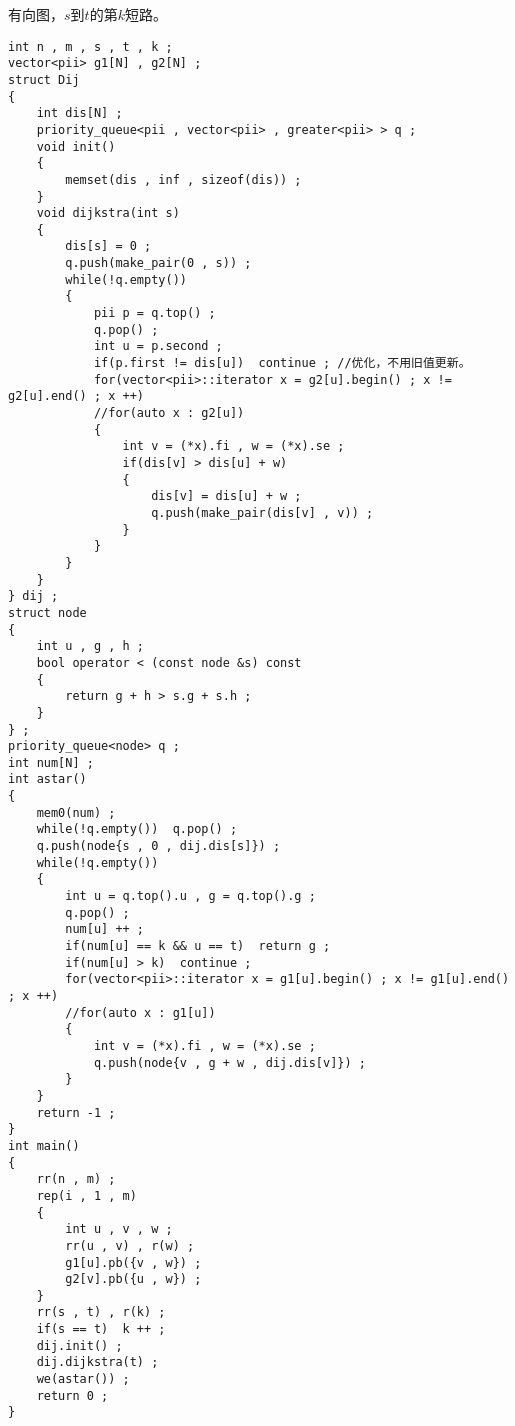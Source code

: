 \documentclass[E:/GsjzTle/main/main.tex]{subfiles}
\begin{document}
有向图，$s$到$t$的第$k$短路。

\begin{lstlisting}
int n , m , s , t , k ;
vector<pii> g1[N] , g2[N] ; 
struct Dij
{
	int dis[N] ;
	priority_queue<pii , vector<pii> , greater<pii> > q ;
	void init()
	{
		memset(dis , inf , sizeof(dis)) ;	
	}
	void dijkstra(int s)
	{
		dis[s] = 0 ;
		q.push(make_pair(0 , s)) ;
		while(!q.empty())
		{
			pii p = q.top() ;
			q.pop() ;
			int u = p.second ;
			if(p.first != dis[u])  continue ; //优化，不用旧值更新。
			for(vector<pii>::iterator x = g2[u].begin() ; x != g2[u].end() ; x ++)
			//for(auto x : g2[u])
			{
				int v = (*x).fi , w = (*x).se ;
				if(dis[v] > dis[u] + w)
				{
					dis[v] = dis[u] + w ;
					q.push(make_pair(dis[v] , v)) ;
				}
			}
		}
	}
} dij ;
struct node
{
	int u , g , h ;
	bool operator < (const node &s) const
	{
		return g + h > s.g + s.h ;
	}
} ;
priority_queue<node> q ;
int num[N] ;
int astar()
{
	mem0(num) ;
	while(!q.empty())  q.pop() ;
	q.push(node{s , 0 , dij.dis[s]}) ;
	while(!q.empty())
	{
		int u = q.top().u , g = q.top().g ;
		q.pop() ;
		num[u] ++ ;
		if(num[u] == k && u == t)  return g ;
		if(num[u] > k)  continue ;
		for(vector<pii>::iterator x = g1[u].begin() ; x != g1[u].end() ; x ++)
		//for(auto x : g1[u])
		{
			int v = (*x).fi , w = (*x).se ; 
			q.push(node{v , g + w , dij.dis[v]}) ;
		}
	}
	return -1 ;
}
int main()
{
	rr(n , m) ;
	rep(i , 1 , m)
	{
		int u , v , w ;
		rr(u , v) , r(w) ;
		g1[u].pb({v , w}) ;
		g2[v].pb({u , w}) ;
	}
	rr(s , t) , r(k) ;
	if(s == t)  k ++ ;
	dij.init() ;
	dij.dijkstra(t) ;
	we(astar()) ;
	return 0 ; 
}

\end{lstlisting}
\end{document}
